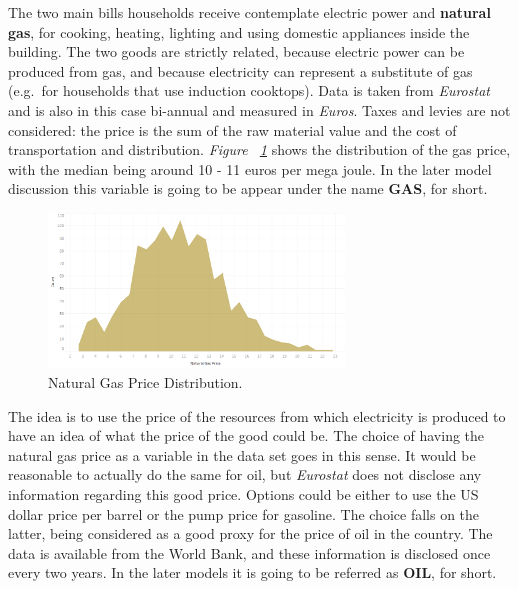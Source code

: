 \documentclass[a4paper,12pt]{book}
\begin{document}
The two main bills households receive contemplate electric power and \textbf{natural gas}, for cooking, heating, lighting and using domestic appliances inside the building. The two goods are strictly related, because electric power can be produced from gas, and because electricity can represent a substitute of gas (e.g.\ for households that use induction cooktops). Data is taken from \textit{Eurostat} and is also in this case bi-annual and measured in \textit{Euros}. Taxes and levies are not considered: the price is the sum of the raw material value and the cost of transportation and distribution. \textit{Figure ~\ref{fig:ngpd}} shows the distribution of the gas price, with the median being around 10 - 11 euros per mega joule. In the later model discussion this variable is going to be appear under the name \textbf{GAS}, for short.

\begin{figure}[tb]
\begin{center}
\captionsetup{justification=centering}
\includegraphics[width=0.7\textwidth]{Images/nGas.png}
\caption{Natural Gas Price Distribution.}
\label{fig:ngpd}
\end{center}
\end{figure}

The idea is to use the price of the resources from which electricity is produced to have an idea of what the price of the good could be. The choice of having the natural gas price as a variable in the data set goes in this sense. It would be reasonable to actually do the same for oil, but \textit{Eurostat} does not disclose any information regarding this good price. Options could be either to use the US dollar price per barrel or the pump price for gasoline. The choice falls on the latter, being considered as a good proxy for the price of oil in the country. The data is available from the World Bank, and these information is disclosed once every two years. In the later models it is going to be referred as \textbf{OIL}, for short.\\
\end{document}
